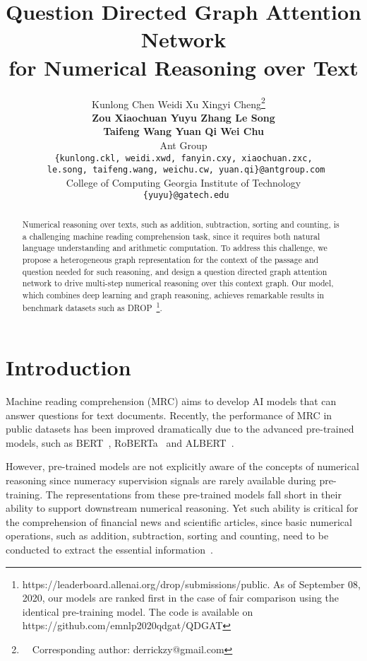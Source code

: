 \documentclass{article}
\title{Question Directed Graph Attention Network \\ for Numerical Reasoning over Text}
\author{Kunlong Chen \quad Weidi Xu \quad Xingyi Cheng\thanks{~~Corresponding author: derrickzy@gmail.com}~~  \\ { \bf  Zou Xiaochuan \quad Yuyu Zhang \quad Le Song } \\ { \bf Taifeng Wang \quad Yuan Qi  \quad Wei Chu } \\
 Ant Group \\
{\tt  \{kunlong.ckl, weidi.xwd, fanyin.cxy, xiaochuan.zxc,} \\
{\tt
le.song, taifeng.wang, weichu.cw, yuan.qi\}@antgroup.com} \\
 College of Computing Georgia Institute of Technology \\
{\tt
\{yuyu\}@gatech.edu}
}
\date{}
\begin{document}
\maketitle

\begin{abstract}
Numerical reasoning over texts, such as addition, subtraction, sorting and counting, is a challenging machine reading comprehension task, since it requires both natural language understanding and arithmetic computation. 
To address this challenge, we propose a heterogeneous graph representation for the context of the passage and question needed for such reasoning, and design a question directed graph attention network to drive multi-step numerical reasoning over this context graph. 
Our model, which combines deep learning and graph reasoning, achieves remarkable results in benchmark datasets such as DROP~\footnote{{https://leaderboard.allenai.org/drop/submissions/public}. As of September 08, 2020, our models are ranked first in the case of fair comparison using the identical pre-training model. The code is available on https://github.com/emnlp2020qdgat/QDGAT}. 

\end{abstract}

\section{Introduction}

\setlength{\abovedisplayskip}{4pt}
\setlength{\abovedisplayshortskip}{1pt}
\setlength{\belowdisplayskip}{4pt}
\setlength{\belowdisplayshortskip}{1pt}






Machine reading comprehension (MRC) aims to develop AI models that can answer questions for text documents. 
Recently, the performance of MRC in public datasets has been improved dramatically due to the advanced pre-trained models, such as BERT~\cite{devlin-etal-2019-bert}, RoBERTa~\cite{DBLP:journals/corr/abs-1907-11692} and ALBERT~\cite{DBLP:journals/corr/abs-1909-11942}.

However, pre-trained models are not explicitly aware of the concepts of numerical reasoning since numeracy supervision signals are rarely available during pre-training. 
The representations from these pre-trained models fall short in their ability to support downstream numerical reasoning.  
Yet such ability is critical for the comprehension of financial news and scientific articles, since basic numerical operations, such as addition, subtraction, sorting and counting, need to be conducted to extract the essential information~\cite{DBLP:conf/naacl/DuaWDSS019}.
\end{document}
